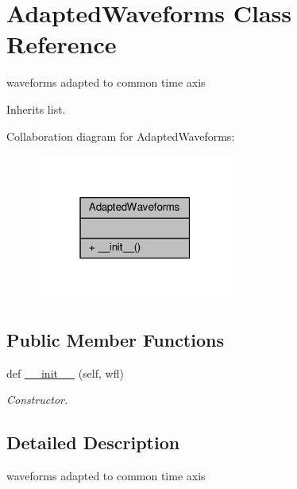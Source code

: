 \hypertarget{classSignalIntegrity_1_1TimeDomain_1_1Waveform_1_1AdaptedWaveforms_1_1AdaptedWaveforms}{}\section{Adapted\+Waveforms Class Reference}
\label{classSignalIntegrity_1_1TimeDomain_1_1Waveform_1_1AdaptedWaveforms_1_1AdaptedWaveforms}


waveforms adapted to common time axis  




Inherits list.



Collaboration diagram for Adapted\+Waveforms\+:\nopagebreak
\begin{figure}[H]
\begin{center}
\leavevmode
\includegraphics[width=183pt]{classSignalIntegrity_1_1TimeDomain_1_1Waveform_1_1AdaptedWaveforms_1_1AdaptedWaveforms__coll__graph}
\end{center}
\end{figure}
\subsection*{Public Member Functions}
\begin{DoxyCompactItemize}
\item 
def \hyperlink{classSignalIntegrity_1_1TimeDomain_1_1Waveform_1_1AdaptedWaveforms_1_1AdaptedWaveforms_a15e87afe4d8ac1102a3665f80cb0611a}{\+\_\+\+\_\+init\+\_\+\+\_\+} (self, wfl)
\begin{DoxyCompactList}\small\item\em Constructor. \end{DoxyCompactList}\end{DoxyCompactItemize}


\subsection{Detailed Description}
waveforms adapted to common time axis 

